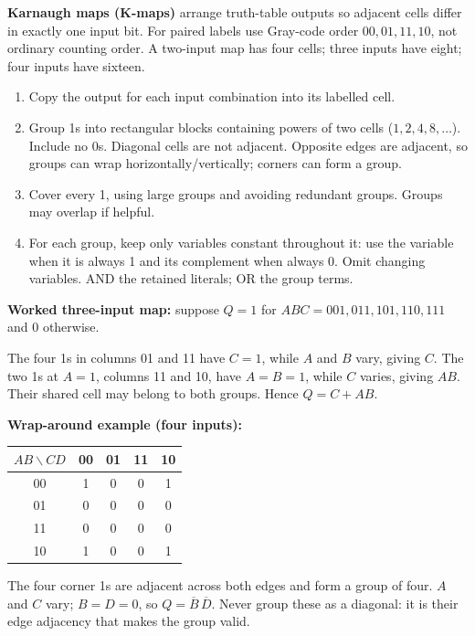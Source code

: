 \documentclass[a4paper,12pt]{article}
\begin{document}
\textbf{Karnaugh maps (K-maps)} arrange truth-table outputs so adjacent cells differ in exactly one input bit. For paired labels use Gray-code order $00,01,11,10$, not ordinary counting order. A two-input map has four cells; three inputs have eight; four inputs have sixteen.
\begin{enumerate}
    \item Copy the output for each input combination into its labelled cell.
    \item Group 1s into rectangular blocks containing powers of two cells ($1,2,4,8,\ldots$). Include no 0s. Diagonal cells are not adjacent. Opposite edges are adjacent, so groups can wrap horizontally/vertically; corners can form a group.
    \item Cover every 1, using large groups and avoiding redundant groups. Groups may overlap if helpful.
    \item For each group, keep only variables constant throughout it: use the variable when it is always 1 and its complement when always 0. Omit changing variables. AND the retained literals; OR the group terms.
\end{enumerate}
\textbf{Worked three-input map:} suppose $Q=1$ for $ABC=001,011,101,110,111$ and 0 otherwise.
\begin{center}
\end{center}
The four 1s in columns 01 and 11 have $C=1$, while $A$ and $B$ vary, giving $C$. The two 1s at $A=1$, columns 11 and 10, have $A=B=1$, while $C$ varies, giving $AB$. Their shared cell may belong to both groups. Hence $Q=C+AB$.

\textbf{Wrap-around example (four inputs):}
\begin{center}
\begin{tabular}{c|c c c c}
$AB\backslash CD$ & 00 & 01 & 11 & 10 \\
\hline
00 & 1 & 0 & 0 & 1 \\
01 & 0 & 0 & 0 & 0 \\
11 & 0 & 0 & 0 & 0 \\
10 & 1 & 0 & 0 & 1 \\
\end{tabular}
\end{center}
The four corner 1s are adjacent across both edges and form a group of four. $A$ and $C$ vary; $B=D=0$, so $Q=\overline{B}\,\overline{D}$. Never group these as a diagonal: it is their edge adjacency that makes the group valid.
\end{document}
